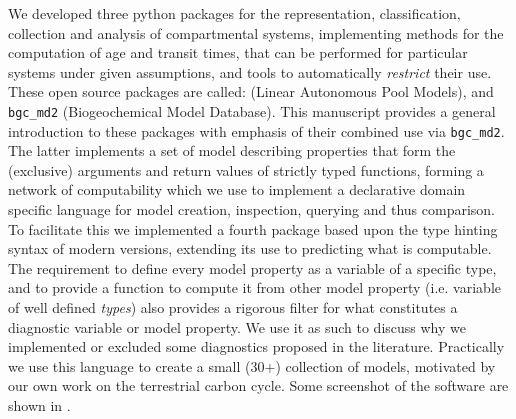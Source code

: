 We developed three python packages for the representation, classification, collection and analysis  of compartmental systems, implementing methods for the computation of age and transit times, that can be performed for particular systems under given assumptions, and tools to automatically \emph{restrict} their use.
These open source packages are called: 
\LAPM (Linear Autonomous Pool Models),
\CompartmentalSystems  and
\texttt{bgc\_md2} (Biogeochemical Model Database).
This manuscript provides a general introduction to these packages 
with emphasis of their combined use via \texttt{bgc\_md2}.
The latter implements a set of model describing properties that form the (exclusive) arguments and return values of strictly typed functions, forming a network of computability which we use 
to implement a declarative domain specific language for model creation, inspection, querying and thus comparison.
To facilitate this we implemented a fourth package \ComputabilityGraphs based upon the  type hinting syntax of modern \python versions, extending its use to predicting what is computable.   
The requirement to define every model property as a variable of a specific
type, and to provide a function to compute it from other model property (i.e.
variable of well defined \emph{types}) also provides a rigorous filter for what
constitutes a diagnostic variable or model property. 
We use it as such to discuss why we implemented or excluded some diagnostics proposed in the literature.
Practically we use this language to create a small
(30+) collection of models, motivated by our own work on the terrestrial carbon
cycle.  Some screenshot of the software are shown in .
